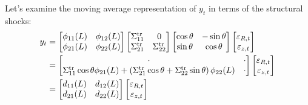 \begin{eg}
    Let's examine the moving average representation of $y_t$ in terms of the structural shocks:
    \begin{align*}
        y_t &= \begin{bmatrix}
            \phi_{11}(L) & \phi_{12}(L) \\
            \phi_{21}(L) & \phi_{22}(L) \\
        \end{bmatrix}
        \begin{bmatrix}
            \Sigma_{11}^{\tr}  &  0 \\
            \Sigma_{21}^{\tr} & \Sigma_{22}^{\tr} \\
        \end{bmatrix}
        \begin{bmatrix}
            \cos \theta & -\sin \theta \\
            \sin \theta & \cos \theta \\
        \end{bmatrix}
        \begin{bmatrix}
             \varepsilon_{R,t} \\
             \varepsilon_{z,t} \\
        \end{bmatrix} \\
        &=
        \begin{bmatrix}
            \cdot &  \cdot \\
            \Sigma_{11}^{\tr} \cos \theta \phi_{21}(L) + \left(\Sigma_{21}^{\tr} \cos \theta + \Sigma_{22}^{\tr} \sin \theta \right)\phi_{22}(L) & \cdot \\
        \end{bmatrix}
        \begin{bmatrix}
             \varepsilon_{R,t} \\
             \varepsilon_{z,t} \\
        \end{bmatrix} \\
        &=
        \begin{bmatrix}
            d_{11}(L) & d_{12}(L) \\
            d_{21}(L) & d_{22}(L) \\
        \end{bmatrix}
        \begin{bmatrix}
             \varepsilon_{R,t} \\
             \varepsilon_{z,t} \\
        \end{bmatrix}

\end{align*}
\end{eg}
